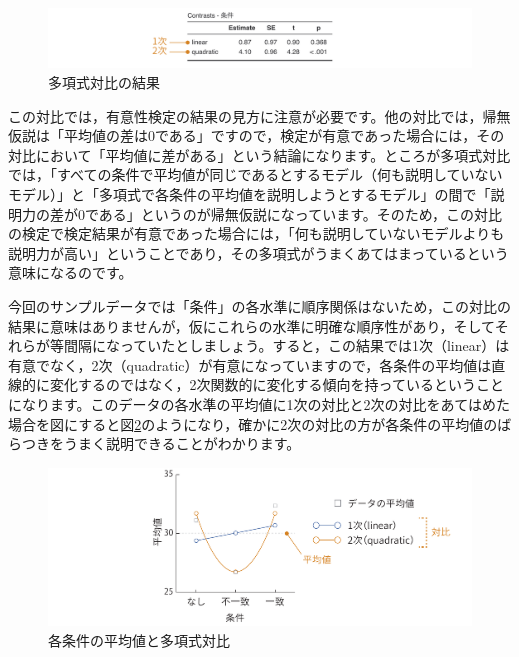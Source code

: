 \documentclass[
  12pt,
  a5jpaper,
  lualatex, ja=standard]{bxjsbook}
\begin{document}
\begin{figure}[!ht]

{\centering \includegraphics[width=1\linewidth]{images/ANOVA/anova-contrast-polynomial} 

}

\caption{多項式対比の結果}\label{fig:ANOVA-anova-contrast-polynomial}
\end{figure}

この対比では，有意性検定の結果の見方に注意が必要です。他の対比では，帰無仮説は「平均値の差は0である」ですので，検定が有意であった場合には，その対比において「平均値に差がある」という結論になります。ところが多項式対比では，「すべての条件で平均値が同じであるとするモデル（何も説明していないモデル）」と「多項式で各条件の平均値を説明しようとするモデル」の間で「説明力の差が0である」というのが帰無仮説になっています。そのため，この対比の検定で検定結果が有意であった場合には，「何も説明していないモデルよりも説明力が高い」ということであり，その多項式がうまくあてはまっているという意味になるのです。

今回のサンプルデータでは「条件」の各水準に順序関係はないため，この対比の結果に意味はありませんが，仮にこれらの水準に明確な順序性があり，そしてそれらが等間隔になっていたとしましょう。すると，この結果では1次（linear）は有意でなく，2次（quadratic）が有意になっていますので，各条件の平均値は直線的に変化するのではなく，2次関数的に変化する傾向を持っているということになります。このデータの各水準の平均値に1次の対比と2次の対比をあてはめた場合を図にすると図\ref{fig:ANOVA-anova-contrast-polynomial-plot}のようになり，確かに2次の対比の方が各条件の平均値のばらつきをうまく説明できることがわかります。

\begin{figure}[!ht]

{\centering \includegraphics[width=1\linewidth]{images/ANOVA/anova-contrast-polynomial-plot} 

}

\caption{各条件の平均値と多項式対比}\label{fig:ANOVA-anova-contrast-polynomial-plot}
\end{figure}
\end{document}
